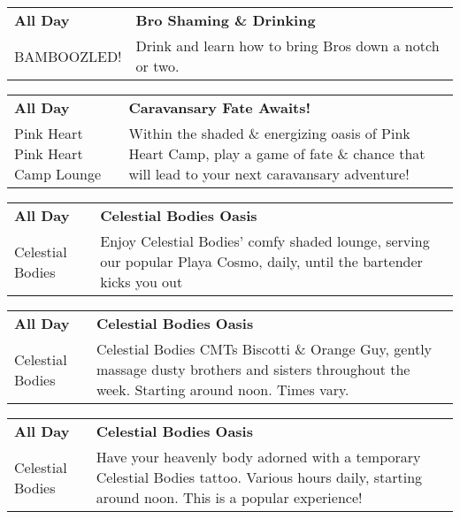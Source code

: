 \begin{tabular}{ p{1in} p{2.2in} }
    \textbf{All Day} & \textbf{Bro Shaming \& Drinking} \\
    BAMBOOZLED! \newline  & Drink and learn how to bring Bros down a notch or two. \\
    \hline 
\end{tabular}
    
\begin{tabular}{ p{1in} p{2.2in} }
    \textbf{All Day} & \textbf{Caravansary Fate Awaits!} \\
    Pink Heart \newline Pink Heart Camp Lounge & Within the shaded \& energizing oasis of Pink Heart Camp, play a game of fate \& chance that will lead to your next caravansary adventure! \\
    \hline 
\end{tabular}
    
\begin{tabular}{ p{1in} p{2.2in} }
    \textbf{All Day} & \textbf{Celestial Bodies Oasis} \\
    Celestial Bodies \newline  & Enjoy Celestial Bodies' comfy shaded lounge, serving our popular Playa Cosmo, daily, until the bartender kicks you out {\char9786} \\
    \hline 
\end{tabular}
    
\begin{tabular}{ p{1in} p{2.2in} }
    \textbf{All Day} & \textbf{Celestial Bodies Oasis} \\
    Celestial Bodies \newline  & Celestial Bodies CMTs Biscotti \& Orange Guy, gently massage dusty brothers and sisters throughout the week. Starting around noon. Times vary. \\
    \hline 
\end{tabular}
    
\begin{tabular}{ p{1in} p{2.2in} }
    \textbf{All Day} & \textbf{Celestial Bodies Oasis} \\
    Celestial Bodies \newline  & Have your heavenly body adorned with a temporary Celestial Bodies tattoo. Various hours daily, starting around noon. This is a popular experience! \\
    \hline 
\end{tabular}
    

